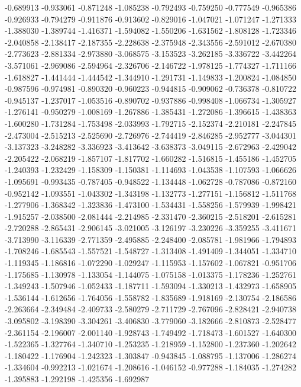 -0.689913
-0.933061
-0.871248
-1.085238
-0.792493
-0.759250
-0.777549
-0.965386
-0.926933
-0.794279
-0.911876
-0.913602
-0.829016
-1.047021
-1.071247
-1.271333
-1.388030
-1.389744
-1.416371
-1.594082
-1.550206
-1.631562
-1.808128
-1.723346
-2.040858
-2.138417
-2.187355
-2.228638
-2.375948
-2.343556
-2.591012
-2.670380
-2.773623
-2.881334
-2.973880
-3.068575
-3.153523
-3.262185
-3.336722
-3.442264
-3.571061
-2.969086
-2.594964
-2.326706
-2.146722
-1.978125
-1.774327
-1.711166
-1.618827
-1.441444
-1.444542
-1.344910
-1.291731
-1.149833
-1.200824
-1.084850
-0.987596
-0.974981
-0.890320
-0.960223
-0.944815
-0.909062
-0.736378
-0.810722
-0.945137
-1.237017
-1.053516
-0.890702
-0.937886
-0.998408
-1.066734
-1.305927
-1.276141
-0.950279
-1.008169
-1.267886
-1.385431
-1.272086
-1.396615
-1.438363
-1.600280
-1.731284
-1.753498
-2.033993
-1.792715
-2.152374
-2.210181
-2.247845
-2.473004
-2.515213
-2.525690
-2.726976
-2.744419
-2.846285
-2.952777
-3.044301
-3.137323
-3.248282
-3.336923
-3.413642
-3.638373
-3.049115
-2.672963
-2.429042
-2.205422
-2.068219
-1.857107
-1.817702
-1.660282
-1.516815
-1.455186
-1.452705
-1.240393
-1.232429
-1.158309
-1.150381
-1.114693
-1.043538
-1.107593
-1.066626
-1.095691
-0.993435
-0.787405
-0.948522
-1.134448
-1.062728
-0.787086
-0.872160
-0.952142
-1.093551
-1.043302
-1.343198
-1.132773
-1.277151
-1.156812
-1.511768
-1.277906
-1.368342
-1.323836
-1.473100
-1.534431
-1.558256
-1.579939
-1.998421
-1.915257
-2.038500
-2.081444
-2.214985
-2.331470
-2.360215
-2.518201
-2.615281
-2.720288
-2.865431
-2.906145
-3.021005
-3.126197
-3.230226
-3.359255
-3.411671
-3.713990
-3.116339
-2.771359
-2.495885
-2.248400
-2.085781
-1.981966
-1.794893
-1.708246
-1.685543
-1.557521
-1.548727
-1.313408
-1.491409
-1.344051
-1.334710
-1.119345
-1.186816
-1.072290
-1.029247
-1.115953
-1.157602
-1.067821
-0.951706
-1.175685
-1.130978
-1.133054
-1.144075
-1.075158
-1.013375
-1.178236
-1.252761
-1.349243
-1.507946
-1.052433
-1.187711
-1.593094
-1.330213
-1.432973
-1.658905
-1.536144
-1.612656
-1.764056
-1.558782
-1.835689
-1.918169
-2.130754
-2.186586
-2.263664
-2.349484
-2.409733
-2.580279
-2.711729
-2.767096
-2.828421
-2.940738
-3.095802
-3.198390
-3.304261
-3.406830
-3.779060
-3.182666
-2.810873
-2.528477
-2.361154
-2.196007
-2.001140
-1.928743
-1.749492
-1.718473
-1.601527
-1.640300
-1.522365
-1.327764
-1.340710
-1.253235
-1.218959
-1.152800
-1.237360
-1.202642
-1.180422
-1.176904
-1.242323
-1.303847
-0.943845
-1.088795
-1.137006
-1.286274
-1.334604
-0.992213
-1.021674
-1.208616
-1.046152
-0.977288
-1.184035
-1.274282
-1.395883
-1.292198
-1.425356
-1.692987
